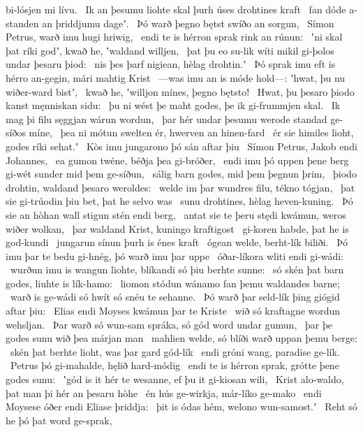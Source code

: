 bi-lósjen mi lívu. \hld\ Ik an þesumu liohte skal
þurh úses drohtines kraft \hld\ fan dóde a-standen
an þriddjumu dageʼ. \hld\ Þó warð þegno bętst
swíðo an sorgun, \hld\ Símon Petrus,
warð imu hugi hriwig, \hld\ endi te is hérron sprak
rink an rúnun: \hld\ ʽni skal þat ríki godʼ, kwað he,
ʽwaldand willjen, \hld\ þat þu eo su-lik wíti mikil
gi-þolos undar þesaru þiod: \hld\ nis þes þarf nigiean,
hèlag drohtin.ʼ \hld\ Þó sprak imu eft is hérro an-gegin,
mári mahtig Krist \hld\ —was imu an is móde hold—:
ʽhwat, þu nu wiðer-ward bistʼ, \hld\ kwað he, ʽwilljon mínes,
þegno bętsto! \hld\ Hwat, þu þesaro þiodo kanst
męnniskan sidu: \hld\ þu ni wést þe maht godes,
þe ik gi-frummjen skal. \hld\ Ik mag þi filu sęggjan
wárun wordun, \hld\ þar hér undar þesumu werode standad
ge-síðos míne, \hld\ þea ni mótun swelten ér,
hwerven an hinen-fard \hld\ ér sie himiles lioht,
godes ríki sehat.ʼ \hld\ Kòs imu jungarono þó
sán aftar þiu \hld\ Símon Petrus,
Jakob endi Johannes, \hld\ ea gumon twéne,
béðja þea gi-bróðer, \hld\ endi imu þó uppen þene berg gi-wét
sunder mid þem ge-síðun, \hld\ sálig barn godes,
mid þem þegnun þrim, \hld\ þiodo drohtin,
waldand þesaro weroldes: \hld\ welde im þar wundres filu,
tékno tógjan, \hld\ þat sie gi-trúodin þiu bet,
þat he selvo was \hld\ sunu drohtines,
hèlag heven-kuning. \hld\ Þó sie an hòhan wall
stigun stén endi berg, \hld\ antat sie te þeru stędi kwámun,
weros wiðer wolkan, \hld\ þar waldand Krist,
kuningo kraftigost \hld\ gi-koren habde,
þat he is god-kundi \hld\ jungarun sínun
þurh is énes kraft \hld\ ógean welde,
berht-lík biliði. \hld\ Þó imu þar te bedu gi-hnég,
þó warð imu þar uppe \hld\ óðar-líkora
wliti endi gi-wádi: \hld\ wurðun imu is wangun liohte,
blíkandi só þiu berhte sunne: \hld\ só skén þat barn godes,
liuhte is lík-hamo: \hld\ liomon stódun
wánamo fan þemu waldandes barne; \hld\ warð is ge-wádi só hwít
só snéu te sehanne. \hld\ Þó warð þar seld-lík þing
giógid aftar þiu: \hld\ Elias endi Moyses
kwámun þar te Kriste \hld\ wið só kraftagne
wordun wehsljan. \hld\ Þar warð só wun-sam spráka,
só gód word undar gumun, \hld\ þar þe godes sunu
wið þea márjan man \hld\ mahlien welde,
só blíði warð uppan þemu berge: \hld\ skén þat berhte lioht,
was þar gard gód-lík \hld\ endi gróni wang,
paradise ge-lík. \hld\ Petrus þó gi-mahalde,
hęlið hard-módig \hld\ endi te is hérron sprak,
grótte þene godes sunu: \hld\ ʽgód is it hér te wesanne,
ef þu it gi-kiosan wili, \hld\ Krist alo-waldo,
þat man þi hér an þesaru hòhe \hld\ én hús ge-wirkja,
már-líko ge-mako \hld\ endi Moysese óðer
endi Eliase þriddja: \hld\ þit is ódas hém,
welono wun-samost.ʼ \hld\ Reht só he þó þat word ge-sprak,
